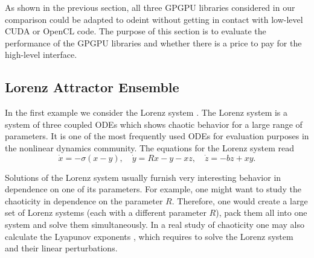 \documentclass[final]{siamltex}
\begin{document}
As shown in the previous section, all three GP\-GPU libraries considered
in our comparison could be adapted to odeint without getting in
contact with low-level CUDA or OpenCL code.  The purpose of this
section is to evaluate the performance of the GPGPU libraries and
whether there is a price to pay for the high-level interface.






%
%

\subsection{Lorenz Attractor Ensemble}

In the first example we consider the Lorenz system \cite{Lorenz-63}. The
Lorenz system is a system of three coupled ODEs which shows chaotic
behavior for a large range of parameters. It is one of the most frequently
used ODEs for evaluation purposes in the nonlinear dynamics community.   %
The equations for the Lorenz system read
\begin{equation}
    \dot{x} = -\sigma \left( x - y \right), \quad
    \dot{y} = R x - y - xz, \quad
    \dot{z} = -bz + xy.
    \label{eq:lorenz}
\end{equation}

Solutions of the Lorenz system usually furnish very interesting
behavior in dependence on one of its parameters.  For example, one
might want to study the chaoticity in dependence on the parameter
$R$. Therefore, one would create a large set of Lorenz systems (each
with a different parameter $R$), pack them all into one system and
solve them simultaneously. In a real study of chaoticity one
may also calculate the Lyapunov exponents \cite{Ott-book-02}, which
requires to solve the Lorenz system and their linear perturbations.

\end{document}
